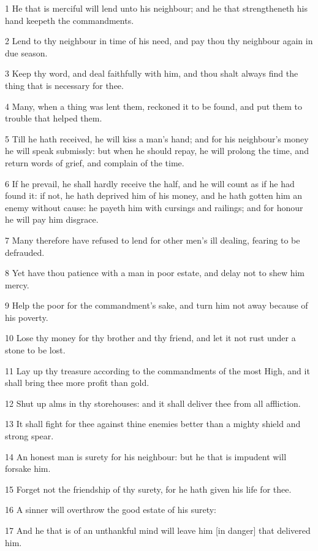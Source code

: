 \par 1 He that is merciful will lend unto his neighbour; and he that strengtheneth his hand keepeth the commandments.
\par 2 Lend to thy neighbour in time of his need, and pay thou thy neighbour again in due season.
\par 3 Keep thy word, and deal faithfully with him, and thou shalt always find the thing that is necessary for thee.
\par 4 Many, when a thing was lent them, reckoned it to be found, and put them to trouble that helped them.
\par 5 Till he hath received, he will kiss a man's hand; and for his neighbour's money he will speak submissly: but when he should repay, he will prolong the time, and return words of grief, and complain of the time.
\par 6 If he prevail, he shall hardly receive the half, and he will count as if he had found it: if not, he hath deprived him of his money, and he hath gotten him an enemy without cause: he payeth him with cursings and railings; and for honour he will pay him disgrace.
\par 7 Many therefore have refused to lend for other men's ill dealing, fearing to be defrauded.
\par 8 Yet have thou patience with a man in poor estate, and delay not to shew him mercy.
\par 9 Help the poor for the commandment's sake, and turn him not away because of his poverty.
\par 10 Lose thy money for thy brother and thy friend, and let it not rust under a stone to be lost.
\par 11 Lay up thy treasure according to the commandments of the most High, and it shall bring thee more profit than gold.
\par 12 Shut up alms in thy storehouses: and it shall deliver thee from all affliction.
\par 13 It shall fight for thee against thine enemies better than a mighty shield and strong spear.
\par 14 An honest man is surety for his neighbour: but he that is impudent will forsake him.
\par 15 Forget not the friendship of thy surety, for he hath given his life for thee.
\par 16 A sinner will overthrow the good estate of his surety:
\par 17 And he that is of an unthankful mind will leave him [in danger] that delivered him.
